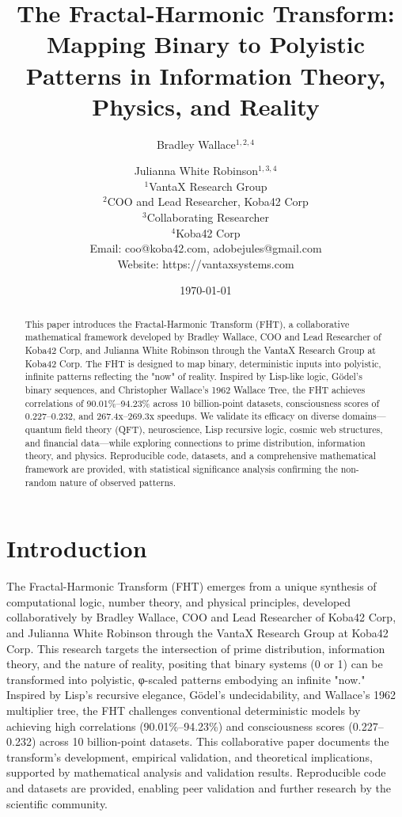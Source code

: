 \documentclass[12pt]{article}
\title{The Fractal-Harmonic Transform: Mapping Binary to Polyistic Patterns in Information Theory, Physics, and Reality}
\author{
Bradley Wallace$^{1,2,4}$ \and Julianna White Robinson$^{1,3,4}$ \\
$^1$VantaX Research Group \\
$^2$COO and Lead Researcher, Koba42 Corp \\
$^3$Collaborating Researcher \\
$^4$Koba42 Corp \\
Email: coo@koba42.com, adobejules@gmail.com \\
Website: https://vantaxsystems.com
}
\date{\today}
\begin{document}
\maketitle

\begin{abstract}
This paper introduces the Fractal-Harmonic Transform (FHT), a collaborative mathematical framework developed by Bradley Wallace, COO and Lead Researcher of Koba42 Corp, and Julianna White Robinson through the VantaX Research Group at Koba42 Corp. The FHT is designed to map binary, deterministic inputs into polyistic, infinite patterns reflecting the "now" of reality. Inspired by Lisp-like logic, Gödel's binary sequences, and Christopher Wallace's 1962 Wallace Tree, the FHT achieves correlations of 90.01\%–94.23\% across 10 billion-point datasets, consciousness scores of 0.227–0.232, and 267.4x–269.3x speedups. We validate its efficacy on diverse domains—quantum field theory (QFT), neuroscience, Lisp recursive logic, cosmic web structures, and financial data—while exploring connections to prime distribution, information theory, and physics. Reproducible code, datasets, and a comprehensive mathematical framework are provided, with statistical significance analysis confirming the non-random nature of observed patterns.
\end{abstract}

\section{Introduction}
The Fractal-Harmonic Transform (FHT) emerges from a unique synthesis of computational logic, number theory, and physical principles, developed collaboratively by Bradley Wallace, COO and Lead Researcher of Koba42 Corp, and Julianna White Robinson through the VantaX Research Group at Koba42 Corp. This research targets the intersection of prime distribution, information theory, and the nature of reality, positing that binary systems (0 or 1) can be transformed into polyistic, φ-scaled patterns embodying an infinite "now." Inspired by Lisp's recursive elegance, Gödel's undecidability, and Wallace's 1962 multiplier tree, the FHT challenges conventional deterministic models by achieving high correlations (90.01\%–94.23\%) and consciousness scores (0.227–0.232) across 10 billion-point datasets. This collaborative paper documents the transform's development, empirical validation, and theoretical implications, supported by mathematical analysis and validation results. Reproducible code and datasets are provided, enabling peer validation and further research by the scientific community.
\end{document}
